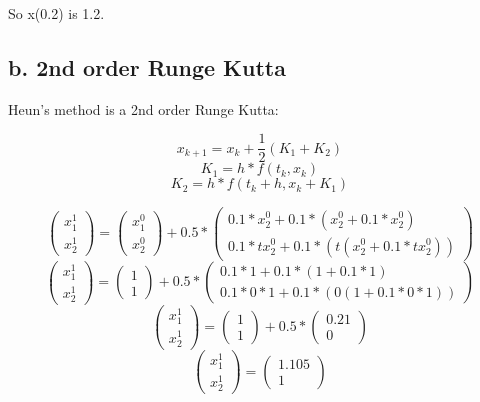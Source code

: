 \documentclass[]{article}
\begin{document}
So x(0.2) is 1.2.

\subsection{b. 2nd order Runge Kutta}\label{b.-2nd-order-runge-kutta}

Heun's method is a 2nd order Runge Kutta:

\[x_{k+1} = x_k + \frac12(K_1 + K_2)\] \[K_1 = h*f(t_k, x_k)\]
\[K_2 = h*f(t_k + h, x_k + K_1)\]

\[
\left(\begin{array}{c} 
x_1^1\\
x_2^1
\end{array}\right)=
\left(\begin{array}{c} 
x_1^0 \\
x_2^0 
\end{array}\right) + 0.5 *
\left(\begin{array}{c}
0.1 * x_2^0 + 0.1 * (x_2^0 + 0.1 * x_2^0) \\
0.1 * tx_2^0 + 0.1 * (t(x_2^0 + 0.1 * tx_2^0)) 
\end{array}\right)
\] \[
\left(\begin{array}{c} 
x_1^1\\
x_2^1
\end{array}\right)=
\left(\begin{array}{c} 
1 \\
1 
\end{array}\right) + 0.5 *
\left(\begin{array}{c}
0.1 * 1 + 0.1 * (1 + 0.1 * 1) \\
0.1 * 0 *1 + 0.1 * ( 0 (1 + 0.1 * 0 * 1)) 
\end{array}\right)
\] \[
\left(\begin{array}{c} 
x_1^1\\
x_2^1
\end{array}\right)=
\left(\begin{array}{c} 
1 \\
1 
\end{array}\right) + 0.5 *
\left(\begin{array}{c}
0.21 \\
0 
\end{array}\right)
\] \[
\left(\begin{array}{c} 
x_1^1\\
x_2^1
\end{array}\right)=
\left(\begin{array}{c} 
1.105 \\
1
\end{array}\right)
\]
\end{document}
